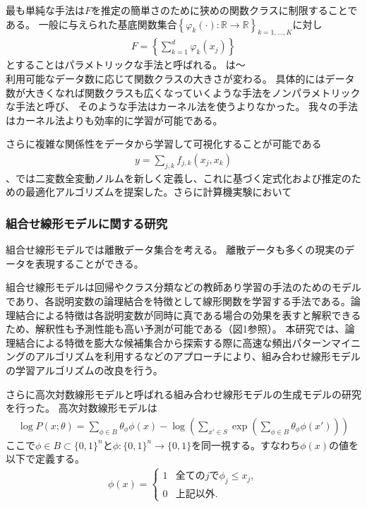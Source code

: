 最も単純な手法は$F$を推定の簡単さのために狭めの関数クラスに制限することである。
一般に与えられた基底関数集合$\left\{\varphi_k(\cdot):\mathbb{R} \to \mathbb{R} \right\}_{k=1,\ldots,K}$に対し
\begin{align*}
  F=\left\{  \sum_{k=1}^d \varphi_k(x_j) \right\}
\end{align*}
とすることはパラメトリックな手法と呼ばれる。
\cite{F}は〜\\

利用可能なデータ数に応じて関数クラスの大きさが変わる。
具体的にはデータ数が大きくなれば関数クラスも広くなっていくような手法をノンパラメトリックな手法と呼び、
そのような手法はカーネル法を使うよりなかった。
我々の手法はカーネル法よりも効率的に学習が可能である。


さらに複雑な関係性をデータから学習して可視化することが可能である
\begin{align*}
    y = \sum_{j,k} f_{j,k} (x_j,x_k)
\end{align*}
\cite{KM01}、\cite{KM02}では二変数全変動ノルムを新しく定義し、これに基づく定式化および推定のための最適化アルゴリズムを提案した。さらに計算機実験において




\subsubsection{組合せ線形モデルに関する研究}

組合せ線形モデルでは離散データ集合を考える。
離散データも多くの現実のデータを表現することができる。

組合せ線形モデルは回帰やクラス分類などの教師あり学習の手法のためのモデルであり、各説明変数の論理結合を特徴として線形関数を学習する手法である\cite{LMY01}。論理結合による特徴は各説明変数が同時に真である場合の効果を表すと解釈できるため、解釈性も予測性能も高い予測が可能である（図1参照）。
本研究では、論理結合による特徴を膨大な候補集合から探索する際に高速な頻出パターンマイニングのアルゴリズムを利用するなどのアプローチにより、組み合わせ線形モデルの学習アルゴリズムの改良を行う。

さらに高次対数線形モデルと呼ばれる組み合わせ線形モデルの生成モデルの研究を行った。
高次対数線形モデルは
\begin{align*}
    \log P(x;\theta) = \sum_{\phi\in B} \theta_\phi \phi(x)  - \log\left( \sum_{x'\in S} \exp\left( \sum_{\phi\in B} \theta_\phi \phi(x') \right) \right)    
\end{align*}
ここで$\phi \in B \subset \{0,1\}^n$と$\phi:\{0,1\}^n\to \{0,1\} $を同一視する。すなわち$\phi(x)$の値を以下で定義する。
\begin{align*}
    \phi(x)  = \begin{cases}
    1 & 全ての j で　\phi_j \le x_j, \\
    0 & 上記以外.
    \end{cases}
\end{align*}

